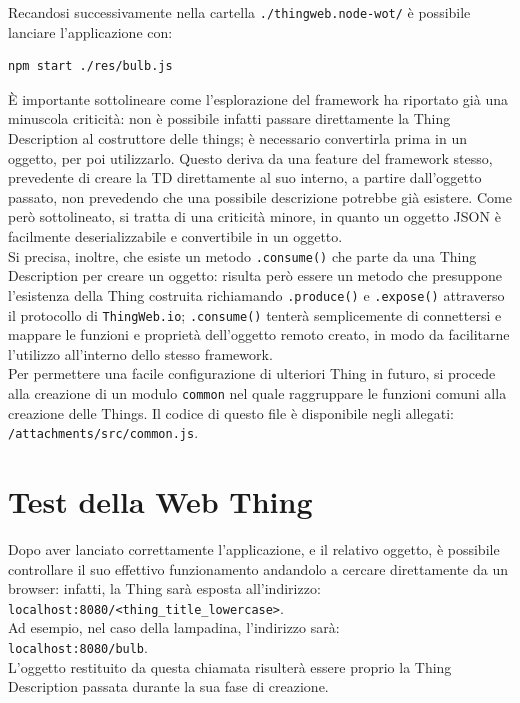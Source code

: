 \documentclass[12pt,a4paper,openright,oneside]{report}
\begin{document}
Recandosi successivamente nella cartella \texttt{./thingweb.node-wot/} è possibile lanciare l'applicazione con:

\begin{lstlisting}[language=bash]
	npm start ./res/bulb.js
\end{lstlisting}

È importante sottolineare come l'esplorazione del framework ha riportato già una minuscola criticità: non è possibile infatti passare direttamente la Thing Description al costruttore delle things; è necessario convertirla prima in un oggetto, per poi utilizzarlo. Questo deriva da una feature del framework stesso, prevedente di creare la TD direttamente al suo interno, a partire dall'oggetto passato, non prevedendo che una possibile descrizione potrebbe già esistere. Come però sottolineato, si tratta di una criticità minore, in quanto un oggetto JSON è facilmente deserializzabile e convertibile in un oggetto.\\

Si precisa, inoltre, che esiste un metodo \texttt{.consume()} che parte da una Thing Description per creare un oggetto: risulta però essere un metodo che presuppone l'esistenza della Thing costruita richiamando \texttt{.produce()} e \texttt{.expose()} attraverso il protocollo di \texttt{ThingWeb.io}; \texttt{.consume()} tenterà semplicemente di connettersi e mappare le funzioni e proprietà dell'oggetto remoto creato, in modo da facilitarne l'utilizzo all'interno dello stesso framework.\\

Per permettere una facile configurazione di ulteriori Thing in futuro, si procede alla creazione di un modulo \texttt{common} nel quale raggruppare le funzioni comuni alla creazione delle Things. Il codice di questo file è disponibile negli allegati: \texttt{/attachments/src/common.js}.\\


\section{Test della Web Thing}
Dopo aver lanciato correttamente l'applicazione, e il relativo oggetto, è possibile controllare il suo effettivo funzionamento andandolo a cercare direttamente da un browser: infatti, la Thing sarà esposta all'indirizzo:\\ \texttt{localhost:8080/<thing\_title\_lowercase>}.\\ Ad esempio, nel caso della lampadina, l'indirizzo sarà:\\ \texttt{localhost:8080/bulb}.\\ L'oggetto restituito da questa chiamata risulterà essere proprio la Thing Description passata durante la sua fase di creazione.\\
\end{document}
